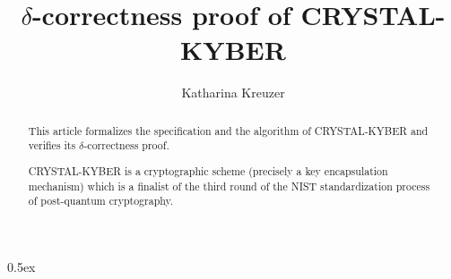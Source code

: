 \documentclass[11pt,a4paper]{article}
\begin{document}
\title{$\delta$-correctness proof of CRYSTAL-KYBER}
\author{Katharina Kreuzer}
\maketitle

\begin{abstract}
This article formalizes the specification and the algorithm of CRYSTAL-KYBER and verifies its $\delta$-correctness proof. 

CRYSTAL-KYBER is a cryptographic scheme (precisely a key encapsulation mechanism) which is a finalist of the third round of the NIST standardization process of post-quantum cryptography. 
\end{abstract}


\newpage
\tableofcontents

\newpage
\parindent 0pt\parskip 0.5ex



\nocite{kyber}



\end{document}
